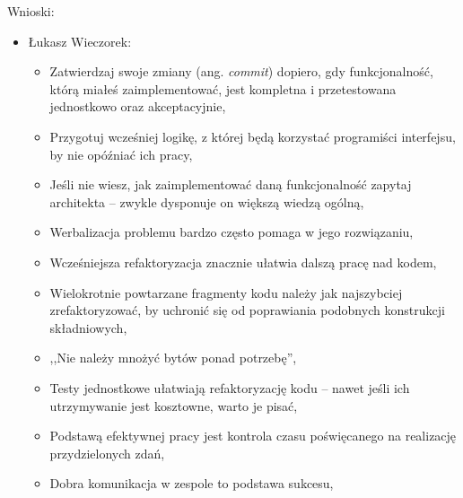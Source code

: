 Wnioski:
\begin{itemize}
\item Łukasz Wieczorek:
\begin{itemize}
\item Zatwierdzaj swoje zmiany (ang. \emph{commit}) dopiero, gdy funkcjonalność, którą miałeś zaimplementować, jest kompletna i przetestowana jednostkowo oraz akceptacyjnie,
\item Przygotuj wcześniej logikę, z której będą korzystać programiści interfejsu, by nie opóźniać ich pracy,
\item Jeśli nie wiesz, jak zaimplementować daną funkcjonalność zapytaj architekta -- zwykle dysponuje on większą wiedzą ogólną,
\item Werbalizacja problemu bardzo często pomaga w jego rozwiązaniu,
\item Wcześniejsza refaktoryzacja znacznie ułatwia dalszą pracę nad kodem,
\item Wielokrotnie powtarzane fragmenty kodu należy jak najszybciej zrefaktoryzować, by uchronić się od poprawiania podobnych konstrukcji składniowych,
\item ,,Nie należy mnożyć bytów ponad potrzebę'',
\item Testy jednostkowe ułatwiają refaktoryzację kodu -- nawet jeśli ich utrzymywanie jest kosztowne, warto je pisać,
\item Podstawą efektywnej pracy jest kontrola czasu poświęcanego na realizację przydzielonych zdań,
\item Dobra komunikacja w zespole to podstawa sukcesu,
\end{itemize}
\end{itemize}